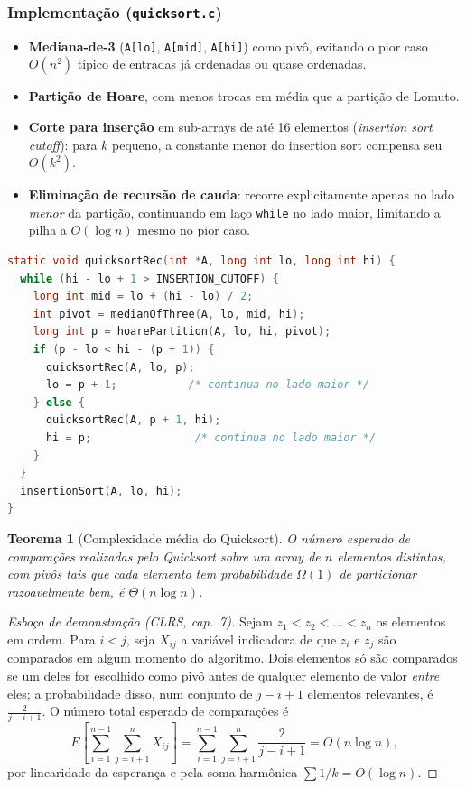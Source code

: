 \documentclass[11pt,a4paper]{article}
\renewcommand{\_}{\underscoreoriginal\allowbreak}
\newtheorem*{teorema}{Teorema}
\begin{document}
\subsubsection*{Implementação (\texttt{quicksort.c})}

\begin{itemize}
  \item \textbf{Mediana-de-3} (\texttt{A[lo]}, \texttt{A[mid]},
    \texttt{A[hi]}) como pivô, evitando o pior caso $O(n^2)$ típico de
    entradas já ordenadas ou quase ordenadas.
  \item \textbf{Partição de Hoare}, com menos trocas em média que a
    partição de Lomuto.
  \item \textbf{Corte para inserção} em sub-arrays de até 16 elementos
    (\emph{insertion sort cutoff}): para $k$ pequeno, a constante menor
    do insertion sort compensa seu $O(k^2)$.
  \item \textbf{Eliminação de recursão de cauda}: recorre explicitamente
    apenas no lado \emph{menor} da partição, continuando em laço
    \texttt{while} no lado maior, limitando a pilha a $O(\log n)$ mesmo
    no pior caso.
\end{itemize}

\begin{lstlisting}[language=C]
static void quicksortRec(int *A, long int lo, long int hi) {
  while (hi - lo + 1 > INSERTION_CUTOFF) {
    long int mid = lo + (hi - lo) / 2;
    int pivot = medianOfThree(A, lo, mid, hi);
    long int p = hoarePartition(A, lo, hi, pivot);
    if (p - lo < hi - (p + 1)) {
      quicksortRec(A, lo, p);
      lo = p + 1;           /* continua no lado maior */
    } else {
      quicksortRec(A, p + 1, hi);
      hi = p;                /* continua no lado maior */
    }
  }
  insertionSort(A, lo, hi);
}
\end{lstlisting}

\begin{teorema}[Complexidade média do Quicksort]
O número esperado de comparações realizadas pelo Quicksort sobre um
array de $n$ elementos distintos, com pivôs tais que cada elemento tem
probabilidade $\Omega(1)$ de particionar razoavelmente bem, é
$\Theta(n \log n)$.
\end{teorema}
\begin{proof}[Esboço de demonstração (CLRS, cap.~7)]
Sejam $z_1 < z_2 < \dots < z_n$ os elementos em ordem. Para $i<j$, seja
$X_{ij}$ a variável indicadora de que $z_i$ e $z_j$ são comparados em
algum momento do algoritmo. Dois elementos só são comparados se um deles
for escolhido como pivô antes de qualquer elemento de valor
\emph{entre} eles; a probabilidade disso, num conjunto de $j-i+1$
elementos relevantes, é $\frac{2}{j-i+1}$. O número total esperado de
comparações é
\[
  E\!\left[\sum_{i=1}^{n-1}\sum_{j=i+1}^{n} X_{ij}\right]
  = \sum_{i=1}^{n-1}\sum_{j=i+1}^{n} \frac{2}{j-i+1} = O(n\log n),
\]
por linearidade da esperança e pela soma harmônica $\sum 1/k = O(\log n)$.
\end{proof}
\end{document}
